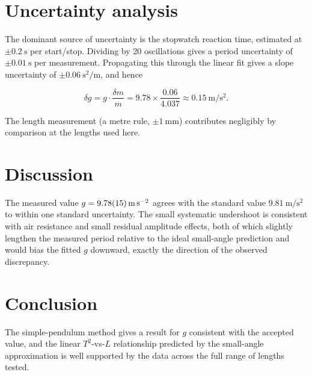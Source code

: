 \documentclass[11pt,a4paper]{article}
\begin{document}

\section{Uncertainty analysis}

The dominant source of uncertainty is the stopwatch reaction time,
estimated at $\pm\SI{0.2}{\second}$ per start/stop. Dividing by 20
oscillations gives a period uncertainty of $\pm\SI{0.01}{\second}$ per
measurement. Propagating this through the linear fit gives a slope
uncertainty of $\pm\SI{0.06}{\second\squared\per\meter}$, and hence

\[
\delta g = g \cdot \frac{\delta m}{m} = 9.78 \times \frac{0.06}{4.037}
\approx \SI{0.15}{\meter\per\second\squared}.
\]

The length measurement (a metre rule, $\pm\SI{1}{\milli\meter}$)
contributes negligibly by comparison at the lengths used here.

\section{Discussion}

The measured value $g = \SI{9.78 \pm 0.15}{\meter\per\second\squared}$
agrees with the standard value $\SI{9.81}{\meter\per\second\squared}$
to within one standard uncertainty. The small systematic
undershoot is consistent with air resistance and small residual
amplitude effects, both of which slightly lengthen the measured
period relative to the ideal small-angle prediction and would bias
the fitted $g$ downward, exactly the direction of the observed
discrepancy.

\section{Conclusion}

The simple-pendulum method gives a result for $g$ consistent with
the accepted value, and the linear $T^2$-vs-$L$ relationship
predicted by the small-angle approximation is well supported by the
data across the full range of lengths tested.
\end{document}
